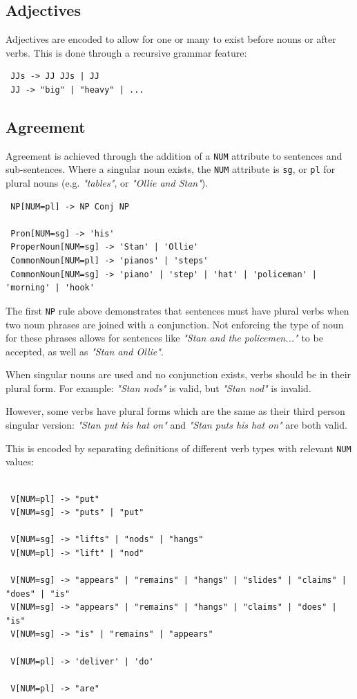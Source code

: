 \documentclass[12pt, a4paper]{article}
\begin{document}
\subsection{Adjectives}

Adjectives are encoded to allow for one or many to exist before nouns or after verbs. This is done through a recursive grammar feature:

\begin{lstlisting}
 JJs -> JJ JJs | JJ
 JJ -> "big" | "heavy" | ...
\end{lstlisting}

\subsection{Agreement}

Agreement is achieved through the addition of a \texttt{NUM} attribute to sentences and sub-sentences. Where a singular noun exists, the \texttt{NUM} attribute is \texttt{sg}, or \texttt{pl} for plural nouns (e.g. \textit{"tables"}, or \textit{"Ollie and Stan"}).

\begin{lstlisting}
 NP[NUM=pl] -> NP Conj NP
 
 Pron[NUM=sg] -> 'his'
 ProperNoun[NUM=sg] -> 'Stan' | 'Ollie'
 CommonNoun[NUM=pl] -> 'pianos' | 'steps'
 CommonNoun[NUM=sg] -> 'piano' | 'step' | 'hat' | 'policeman' | 'morning' | 'hook'
\end{lstlisting}

The first \texttt{NP} rule above demonstrates that sentences must have plural verbs when two noun phrases are joined with a conjunction. Not enforcing the type of noun for these phrases allows for sentences like \textit{"Stan and the policemen..."} to be accepted, as well as \textit{"Stan and Ollie"}.

When singular nouns are used and no conjunction exists, verbs should be in their plural form. For example: \textit{"Stan nods"} is valid, but \textit{"Stan nod"} is invalid.

However, some verbs have plural forms which are the same as their third person singular version: \textit{"Stan put his hat on"} and \textit{"Stan puts his hat on"} are both valid.

This is encoded by separating definitions of different verb types with relevant \texttt{NUM} values:

\begin{lstlisting}

 V[NUM=pl] -> "put" 
 V[NUM=sg] -> "puts" | "put"
 
 V[NUM=sg] -> "lifts" | "nods" | "hangs"
 V[NUM=pl] -> "lift" | "nod"
 
 V[NUM=sg] -> "appears" | "remains" | "hangs" | "slides" | "claims" | "does" | "is"
 V[NUM=sg] -> "appears" | "remains" | "hangs" | "claims" | "does" | "is"
 V[NUM=sg] -> "is" | "remains" | "appears"
 
 V[NUM=pl] -> 'deliver' | 'do'
 
 V[NUM=pl] -> "are"
\end{lstlisting}
\end{document}
